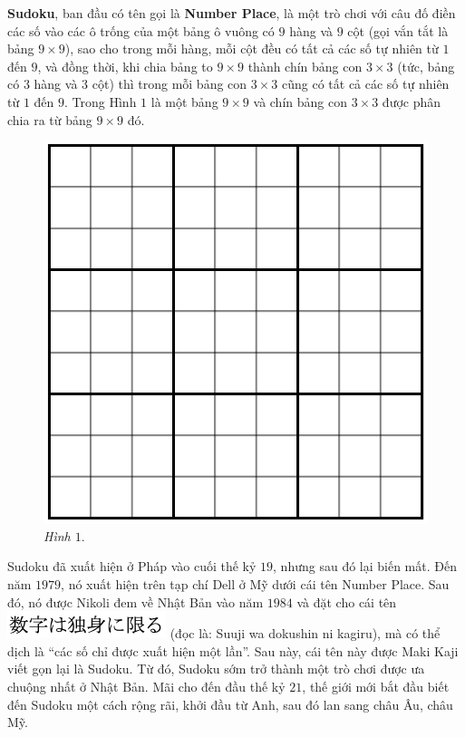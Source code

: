 	\begin{multicols}{2}
		\textbf{\color{toancuabi}Sudoku}, ban đầu có tên gọi là \textbf{\color{toancuabi}Number Place}, là một trò chơi với câu đố điền các số vào các ô trống của một bảng ô vuông có $9$ hàng và $9$ cột (gọi vắn tắt là bảng $9\times 9$), sao cho trong mỗi hàng, mỗi cột đều có tất cả các số tự nhiên từ $1$ đến $9$, và đồng thời, khi chia bảng to $9\times9$ thành chín bảng con $3\times 3$ (tức, bảng có $3$ hàng và $3$ cột) thì trong mỗi bảng con $3\times 3$ cũng có tất cả các số tự nhiên từ $1$ đến $9$. Trong Hình $1$ là một bảng $9\times 9$ và chín bảng con $3\times 3$ được phân chia ra từ bảng $9\times 9$ đó.
		\begin{figure}[H]
			\vspace*{-5pt}
			\centering
			\captionsetup{labelformat=empty, justification=centering}
			\includegraphics[scale=0.35]{hinh1}
			\caption{\textit{\small Hình $1.$}}
			\vspace*{-5pt}
		\end{figure}
	\end{multicols}
	Sudoku đã xuất hiện ở Pháp vào cuối thế kỷ $19$, nhưng sau đó lại biến mất. Đến năm $1979$, nó xuất hiện trên tạp chí Dell ở Mỹ dưới cái tên Number Place. Sau đó, nó được Nikoli đem về Nhật Bản vào năm $1984$ và đặt cho cái tên  \includegraphics[scale=0.4]{sudoku} (đọc là: Suuji wa dokushin ni kagiru), mà có thể dịch là “các số chỉ được xuất hiện một lần”. Sau này, cái tên này được Maki Kaji viết gọn lại là Sudoku. Từ đó, Sudoku sớm trở thành một trò chơi được ưa chuộng nhất ở Nhật Bản. Mãi cho đến đầu thế kỷ $21$, thế giới mới bắt đầu biết đến Sudoku một cách rộng rãi, khởi đầu từ Anh, sau đó lan sang châu Âu, châu Mỹ.
